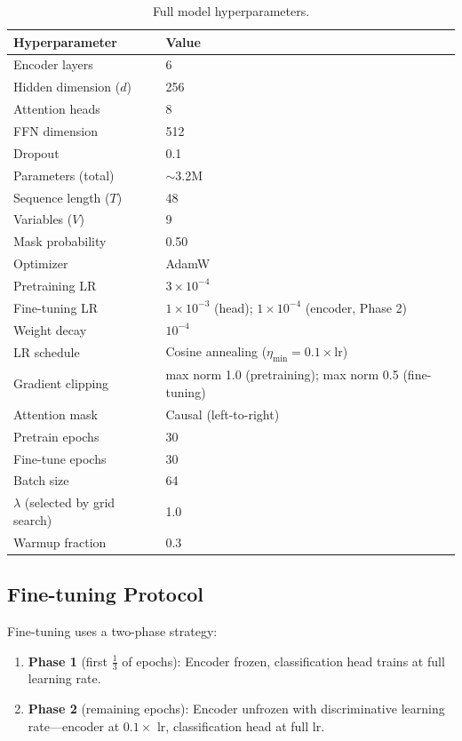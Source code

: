 \documentclass{article}
\begin{document}
\begin{table}[htbp]
\centering
\caption{Full model hyperparameters.}
\begin{tabular}{@{}ll@{}}
\toprule
Hyperparameter & Value \\
\midrule
Encoder layers & 6 \\
Hidden dimension ($d$) & 256 \\
Attention heads & 8 \\
FFN dimension & 512 \\
Dropout & 0.1 \\
Parameters (total) & $\sim$3.2M \\
\midrule
Sequence length ($T$) & 48 \\
Variables ($V$) & 9 \\
Mask probability & 0.50 \\
\midrule
Optimizer & AdamW \\
Pretraining LR & $3 \times 10^{-4}$ \\
Fine-tuning LR & $1 \times 10^{-3}$ (head); $1 \times 10^{-4}$ (encoder, Phase 2) \\
Weight decay & $10^{-4}$ \\
LR schedule & Cosine annealing ($\eta_{\min} = 0.1 \times \text{lr}$) \\
Gradient clipping & max norm 1.0 (pretraining); max norm 0.5 (fine-tuning) \\
Attention mask & Causal (left-to-right) \\
Pretrain epochs & 30 \\
Fine-tune epochs & 30 \\
Batch size & 64 \\
$\lambda$ (selected by grid search) & 1.0 \\
Warmup fraction & 0.3 \\
\bottomrule
\end{tabular}
\end{table}

\subsection{Fine-tuning Protocol}

Fine-tuning uses a two-phase strategy:
\begin{enumerate}
    \item \textbf{Phase 1} (first $\frac{1}{3}$ of epochs): Encoder frozen, classification head trains at full learning rate.
    \item \textbf{Phase 2} (remaining epochs): Encoder unfrozen with discriminative learning rate---encoder at $0.1 \times$ lr, classification head at full lr.
\end{enumerate}
\end{document}
